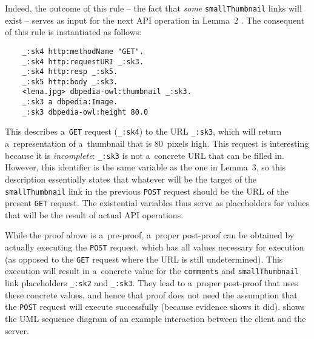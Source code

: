Indeed, the outcome of this rule -- the fact that \emph{some} \verb!smallThumbnail! links will exist --
serves as input for the next API operation in Lemma~2 .
The consequent of this rule is instantiated as follows:
\begin{Verbatim}
    _:sk4 http:methodName "GET".
    _:sk4 http:requestURI _:sk3.
    _:sk4 http:resp _:sk5.
    _:sk5 http:body _:sk3.
    <lena.jpg> dbpedia-owl:thumbnail _:sk3.
    _:sk3 a dbpedia:Image.
    _:sk3 dbpedia-owl:height 80.0
\end{Verbatim}
This describes a~\verb!GET! request (\verb!_:sk4!) to the URL \verb!_:sk3!,
which will return a~representation of a~thumbnail that is 80~pixels high.
This request is interesting because it is \emph{incomplete}:
\verb!_:sk3! is not a~concrete URL that can be filled in. 
However, this identifier is the same variable as the one in Lemma~3,
so this description essentially states
that whatever will be the target of the \verb!smallThumbnail! link in the previous \verb!POST! request
should be the URL of the present \verb!GET! request.
The existential variables thus serve as placeholders
for values that will be the result of actual API operations.

While the proof above is a~pre-proof,
a~proper post-proof can be obtained by actually executing the \verb!POST! \http request,
which has all values necessary for execution
(as opposed to the \verb!GET! request where the URL is still undetermined).
This execution will result in a~concrete value
for the \verb!comments! and \verb!smallThumbnail! link placeholders \verb!_:sk2! and \verb!_:sk3!.
They lead to a~proper post-proof that uses these concrete values,
and hence that proof does not need the assumption that the \verb!POST! request will execute successfully
(because evidence shows it did).
 shows the UML sequence diagram
of an example interaction between the client and the server.


